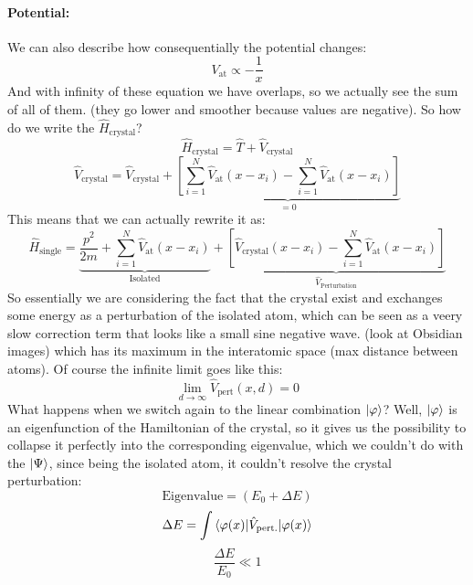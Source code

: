 \paragraph{Potential:} We can also describe how consequentially the potential changes: 
\begin{equation}
    V_{\text{at}} \propto - \frac{1}{x}
\end{equation}
And with infinity of these equation we have overlaps, so we actually see the sum of all of them. (they go lower and smoother because values are negative). So how do we write the $\hat{H}_{\text{crystal}}$? 
\begin{equation}
    \hat{H}_{\text{crystal}} = \hat{T} + \hat{V}_{\text{crystal}}
\end{equation}
\begin{equation}
    \hat{V}_{\text{crystal}} = \hat{V}_{\text{crystal}} + \underbrace{\left[ \sum_{i=1}^N \hat{V}_{\text{at}}(x - x_i) - \sum_{i=1}^N \hat{V}_{\text{at}}(x - x_i) \right]}_{= 0}
\end{equation}
This means that we can actually rewrite it as:
\begin{equation}
    \hat{H}_{\text{single}} = \underbrace{\frac{p^2}{2m} + \sum_{i=1}^{N}\hat{V}_{\text{at}}(x-x_i)}_{\text{Isolated}} + \underbrace{\left[ \hat{V}_{\text{crystal}} (x - x_i) - \sum_{i=1}^N \hat{V}_{\text{at}}(x - x_i) \right]}_{\hat{V}_{\text{Perturbation}}}
\end{equation}
So essentially we are considering the fact that the crystal exist and exchanges some energy as a perturbation of the isolated atom, which can be seen as a veery slow correction term that looks like a small sine negative wave. (look at Obsidian images) which has its maximum in the interatomic space (max distance between atoms). Of course the infinite limit goes like this:
\begin{equation}
    \lim_{d \rightarrow \infty} \hat{V}_{\text{pert}}(x, d) = 0
\end{equation}
What happens when we switch again to the linear combination $\ket{\varphi}$? Well, $\ket{\varphi}$ is an eigenfunction of the Hamiltonian of the crystal, so it gives us the possibility to collapse it perfectly into the corresponding eigenvalue, which we couldn't do with the $\ket{\Psi}$, since being the isolated atom, it couldn't resolve the crystal perturbation:
\begin{equation}
    \text{Eigenvalue} = (E_0 + \Delta E)
\end{equation}
\begin{equation}
    \Delta E = \int\braket{\varphi(x) | \hat{V}_{\text{pert.}} | \varphi(x)}
\end{equation}
\begin{equation}
    \frac{\Delta E}{E_0} \ll 1
\end{equation}
